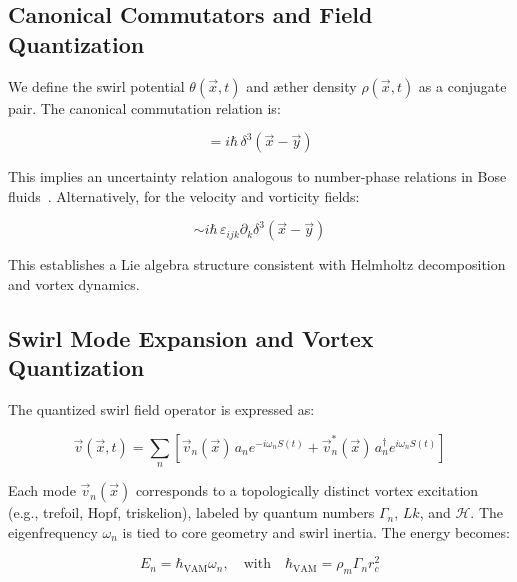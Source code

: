 \documentclass[preprint]{revtex4-2}
\begin{document}
    \subsection{Canonical Commutators and Field Quantization}
    We define the swirl potential \( \theta(\vec{x}, t) \) and æther density \( \rho(\vec{x}, t) \) as a conjugate pair. The canonical commutation relation is:

    \begin{equation}
    [\theta(\vec{x}), \rho(\vec{y})] = i\hbar\,\delta^3(\vec{x} - \vec{y})
    \label{eq:canonical_commutator}
    \end{equation}

    This implies an uncertainty relation analogous to number-phase relations in Bose fluids~\cite{volovik2003universe}. Alternatively, for the velocity and vorticity fields:

    \begin{equation}
    [v_i(\vec{x}), \omega_j(\vec{y})] \sim i\hbar\,\varepsilon_{ijk} \partial_k \delta^3(\vec{x} - \vec{y})
    \end{equation}

    This establishes a Lie algebra structure consistent with Helmholtz decomposition and vortex dynamics.

    \subsection{Swirl Mode Expansion and Vortex Quantization}
    The quantized swirl field operator is expressed as:

    \begin{equation}
    \vec{v}(\vec{x}, t) = \sum_n \left[ \vec{v}_n(\vec{x})\, a_n e^{-i\omega_n S(t)} + \vec{v}_n^*(\vec{x})\, a_n^\dagger e^{i\omega_n S(t)} \right]
    \end{equation}

    Each mode \( \vec{v}_n(\vec{x}) \) corresponds to a topologically distinct vortex excitation (e.g., trefoil, Hopf, triskelion), labeled by quantum numbers \( \Gamma_n \), \( Lk \), and \( \mathcal{H} \). The eigenfrequency \( \omega_n \) is tied to core geometry and swirl inertia. The energy becomes:

    \begin{equation}
    E_n = \hbar_{\text{VAM}} \omega_n, \quad \text{with} \quad \hbar_{\text{VAM}} = \rho_{\scriptscriptstyle\boldsymbol\!m} \Gamma_n r_c^2
    \end{equation}
\end{document}

